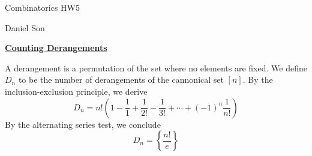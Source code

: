 \documentclass{article}
\newcommand{\new}[1]{
    \vspace{2mm}
    \noindent
    \textbf{
    \underline{#1}}
}
\begin{document}
\begin{center}
\LARGE
Combinatorics HW5

\Large
Daniel Son
\end{center}

\new{Counting Derangements}
A derangement is a permutation of the set 
where no elements are fixed. 
We define $D_n$ to be the number of 
derangements of the cannonical set $[n]$.
By the inclusion-exclusion 
principle, we derive 
\[
    D_n = n!\left(1 - \frac{1}1 + \frac1{2!} - \frac1{3!} + \cdots +(-1)^n\frac1{n!}\right)
\]
By the alternating series test, we conclude 
\[
    D_n = \left\{
        \frac{n!}e
    \right\}
\]
\end{document}
